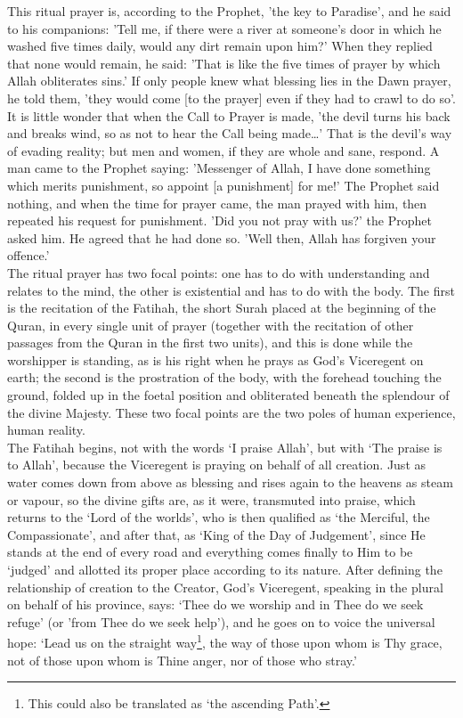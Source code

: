 \documentclass[10pt, twoside]{book}
\begin{document}
This ritual prayer is, according to the Prophet, 'the key to Paradise', and he said to his 
companions: 'Tell me, if there were a river at someone's door in which he washed five times daily, 
would any dirt remain upon him?' When they replied that none would remain, he said: 'That is like the 
five times of prayer by which Allah obliterates sins.' If only people knew what blessing lies in the 
Dawn prayer, he told them, 'they would come [to the prayer] even if they had to crawl to do so'. It 
is little wonder that when the Call to Prayer is made, 'the devil turns his back and breaks wind, so 
as not to hear the Call being made\ldots' That is the devil's way of evading reality; but men and 
women, if they are whole and sane, respond. A man came to the Prophet saying: 'Messenger of Allah, I 
have done something which merits punishment, so appoint [a punishment] for me!' The Prophet said 
nothing, and when the time for prayer came, the man prayed with him, then repeated his request for 
punishment. 'Did you not pray with us?' the Prophet asked him. He agreed that he had done so. 'Well 
then, Allah has forgiven your offence.' \\

The ritual prayer has two focal points: one has to do with understanding and relates to the mind, the 
other is existential and has to do with the body. The first is the recitation of the Fatihah, the 
short Surah placed at the beginning of the Quran, in every single unit of prayer (together with the 
recitation of other passages from the Quran in the first two units), and this is done while the 
worshipper is standing, as is his right when he prays as God's Viceregent on earth; the second is the 
prostration of the body, with the forehead touching the ground, folded up in the foetal position and 
obliterated beneath the splendour of the divine Majesty. These two focal points are the two poles of 
human experience, human reality. \\

The Fatihah begins, not with the words `I praise Allah', but with `The praise is to Allah', because 
the Viceregent is praying on behalf of all creation. Just as water comes down from above as blessing 
and rises again to the heavens as steam or vapour, so the divine gifts are, as it were, transmuted 
into praise, which returns to the `Lord of the worlds', who is then qualified as `the Merciful, the 
Compassionate', and after that, as `King of the Day of Judgement', since He stands at the end of 
every road and everything comes finally to Him to be `judged' and allotted its proper place according 
to its nature. After defining the relationship of creation to the Creator, God's Viceregent, speaking 
in the plural on behalf of his province, says: `Thee do we worship and in Thee do we seek refuge' (or 
'from Thee do we seek help'), and he goes on to voice the universal hope: `Lead us on the straight 
way\footnote{This could also be translated as `the ascending Path'.}, the way of those upon whom is Thy grace, not of those upon whom is Thine anger, nor of those 
who stray.' \\
\end{document}
